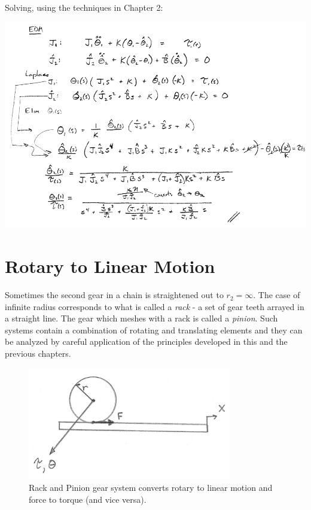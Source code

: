 \begin{ExampleCont}

Solving, using the techniques in Chapter 2:

\includegraphics[width=6.0in]{figs03/00753a.png}

\end{ExampleCont}


\section{Rotary to Linear Motion}


Sometimes the second gear in a chain is straightened out to $r_2 = \infty$.  The case of infinite radius corresponds to what is called a {\it rack} - a set of gear teeth arrayed in a straight line.  The gear which meshes with a rack is called a {\it pinion}.
Such systems contain a combination of rotating and translating elements and they can be analyzed by careful application of the principles developed in this and the previous chapters.

\begin{figure}\centering
\includegraphics[width=3.5in]{figs03/00755a.png}
\caption{Rack and Pinion gear system converts rotary to linear motion and force to torque (and vice versa).}\label{basicrotarylinear}
\end{figure}


